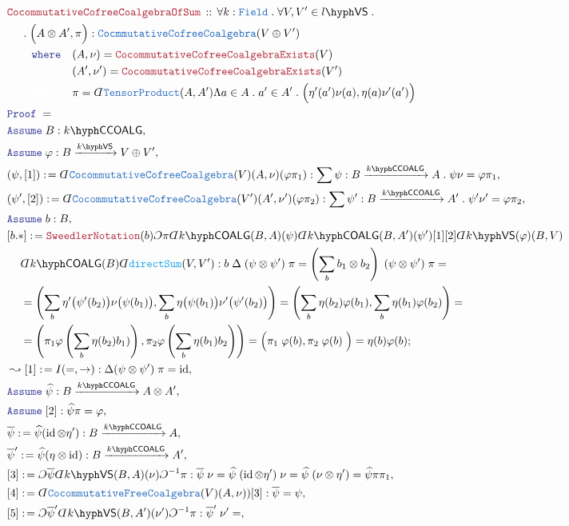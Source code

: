 \documentclass[12pt]{scrartcl}%
\newcommand{\TYPE}[1]{\textcolor{NavyBlue}{\mathtt{#1}}}%
\newcommand{\FUNC}[1]{\textcolor{Cerulean}{\mathtt{#1}}}%
\newcommand{\LOGIC}[1]{\textcolor{Blue}{\mathtt{#1}}}%
\newcommand{\THM}[1]{\textcolor{Maroon}{\mathtt{#1}}}%
\renewcommand{\.}{\; . \;} %
\newcommand{\de}{: \kern 0.1pc =} %
\newcommand{\where}{\LOGIC{where}} %
\newcommand{\Theorem}[2]{& \THM{#1} \, :: \, #2 \\ & \Proof = \\ } %
\newcommand{\NewLine}{\\ & \kern 1pc}%
\newcommand{\Page}[1]{ \begin{align*} #1 \end{align*}  }%
\newcommand{ \bd }{ \ByDef }%
\DeclareMathOperator*{\id}{id}%
\newcommand{\Say}[3]{& #1 \de #2 : #3, \\} %
\newcommand{\Conclude}[3]{& #1 \de #2 : #3; \\}%
\newcommand{\Derive}[3]{& \leadsto #1 \de #2 : #3, \\} %
\newcommand{\Assume}[2]{& \LOGIC{Assume} \; #1 : #2, \\} %
\newcommand{\ByDef}{\rotatebox[origin=c]{-180}{$D$}}%
\newcommand{\ByConstr}{\rotatebox[origin=c]{-180}{$C$}}%
\newcommand{\Proof}{\LOGIC{Proof} \; } %
\newcommand{\Arrow}[1]{\xrightarrow{#1}}%
\newcommand{\VS}[1]{#1\hyph\mathsf{VS}} %
\newcommand{\Field}{\TYPE{Field}}
\newcommand{\COALG}[1]{#1\hyph\mathsf{COALG}}%
\newcommand{\CCOALG}[1]{#1\hyph\mathsf{CCOALG}}%
\begin{document}
\Page{
	\Theorem{CocommutativeCofreeCoalgebraOfSum}
	{
		\forall k : \Field \. 
		\forall V,V' \in \VS{l} \. 
		\NewLine \. 
		\Big(A \otimes A' , \pi\Big) : \TYPE{CocmmutativeCofreeCoalgebra}(V \oplus V') \NewLine 
		\quad \where \quad (A,\nu) = \THM{CocommutativeCofreeCoalgebraExists}(V) 
		\NewLine
		\quad {\color{white} \mathtt{where}} \quad (A',\nu') = \THM{CocommutativeCofreeCoalgebraExists}(V')
		\NewLine
		\quad {\color{white} \mathtt{where}} \quad \pi  = \bd \TYPE{TensorProduct}(A,A') 
		\Lambda a \in A \. a' \in A' \. \Big(\eta'(a')\nu(a), \eta(a)\nu'(a')\Big)
	}
	\Assume{B}{\CCOALG{k}}
	\Assume{\varphi}{B \Arrow{\VS{k}} V \oplus V'}
	\Say{(\psi, [1])}{\bd \TYPE{CocommutativeCofreeCoalgebra}(V)(A,\nu)(\varphi \pi_1)}
	{\sum \psi : B \Arrow{\CCOALG{k}} A \. \psi \nu = \varphi \pi_1 } 
	\Say{(\psi', [2])}{\bd \TYPE{CocommutativeCofreeCoalgebra}(V')(A',\nu')(\varphi \pi_2)}
	{\sum \psi' : B \Arrow{\CCOALG{k}} A' \. \psi' \nu' = \varphi \pi_2} 
	\Assume{b}{B}
	\Conclude{[b.*]}{ \THM{SweedlerNotation}(b) \ByConstr \pi \bd \COALG{k}(B,A)(\psi) \bd \COALG{k}(B,A')(\psi')[1][2]
		\bd\VS{k}(\varphi)(B,V) \NewLine  \bd \COALG{k}(B) \bd \FUNC{directSum}(V,V')    }
	{
		b \; \Delta \; (\psi \otimes \psi') \; \pi  =
		\left( \sum_b  b_1 \otimes b_2 \right) \; (\psi \otimes \psi')  \; \pi = \NewLine = 
		\left( \sum_b \eta'\big(\psi'(b_2)\big) \nu\big( \psi(b_1)\big), \sum_b \eta\big(\psi(b_1)\big) \nu'\big( \psi'(b_2)\big)\right) = 
		\left( \sum_b \eta(b_2) \varphi(b_1), \sum_b \eta (b_1) \varphi(b_2)\right) = \NewLine = 
		\left(  \pi_1 \varphi \left( \sum_b \eta(b_2) b_1)\right), \pi_ 2 \varphi \left( \sum_b \eta(b_1) b_2 \right)\right) = 
		\Big(  \pi_1 \; \varphi(b) , \pi_2 \; \varphi(b) \; \Big) =
		\eta(b) \varphi(b)                                                               
	}
	\Derive{[1]}{I(=,\to)}{ \Delta (\psi \otimes \psi') \; \pi = \id  }
	\Assume{\widehat{\psi}}{ B  \Arrow{\CCOALG{k}} A \otimes A' }
	\Assume{[2]}{\widehat{\psi} \pi = \varphi}
	\Say{\overline{\psi}}{ \widehat{\psi} (\id \otimes \eta')  }{B \Arrow{\CCOALG{k}} A }
	\Say{\overline{\psi}'}{ \widehat{\psi} (\eta \otimes \id )  }{B \Arrow{\CCOALG{k}} A' }
	\Say{[3]}{ \ByConstr \overline{\psi} \bd \VS{k}(B,A)(\nu)\ByConstr^{-1} \pi    }
	{
		 \overline{\psi} \; \nu =
		 \widehat{\psi}  \; (\id \otimes \eta') \; \nu =
		 \widehat{\psi}  \; (\nu \otimes \eta')  = 
		 \widehat{\psi} \pi \pi_1  
	}
	\Say{[4]}{\bd \TYPE{CocommutativeFreeCoalgebra}(V)(A,\nu))[3]}{ \overline{\psi} = \psi } 
	\Say{[5]}{ \ByConstr \overline{\psi}' \bd \VS{k}(B,A')(\nu')\ByConstr^{-1} \pi    }
	{
		 \overline{\psi}' \; \nu' =
}}
\end{document}
